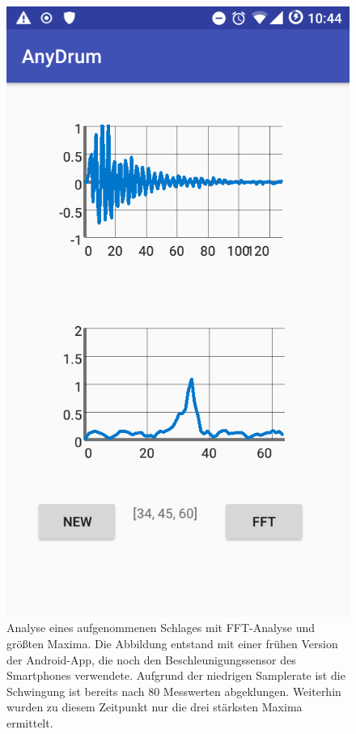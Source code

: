 \begin{figure}[H]
	\centering
	\includegraphics[scale=0.4]{figures/gui_FFT.png}
	\caption{Analyse eines aufgenommenen Schlages mit FFT-Analyse und größten Maxima. Die Abbildung entstand mit einer frühen Version der Android-App, die noch den Beschleunigungssensor des Smartphones verwendete. Aufgrund der niedrigen Samplerate ist die Schwingung ist bereits nach 80 Messwerten abgeklungen. Weiterhin wurden zu diesem Zeitpunkt nur die drei stärksten Maxima ermittelt.}
	\label{fig:guiA}
\end{figure}


